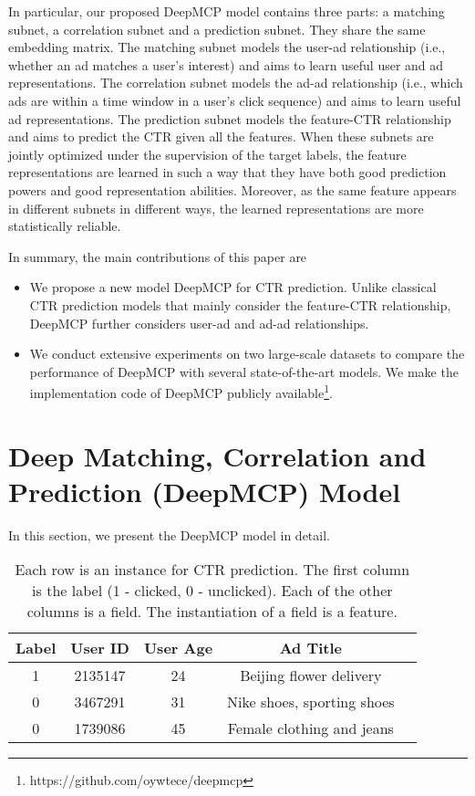\documentclass{article}
\begin{document}
In particular, our proposed DeepMCP model contains three parts: a matching subnet, a correlation subnet and a prediction subnet. They share the same embedding matrix.
The matching subnet models the user-ad relationship (i.e., whether an ad matches a user's interest) and aims to learn useful user and ad representations.
The correlation subnet models the ad-ad relationship (i.e., which ads are within a time window in a user's click sequence) and aims to learn useful ad representations.
The prediction subnet models the feature-CTR relationship and aims to predict the CTR given all the features.
When these subnets are jointly optimized under the supervision of the target labels, the feature representations are learned in such a way that they have both good prediction powers and good representation abilities. Moreover, as the same feature appears in different subnets in different ways, the learned representations are more statistically reliable.

In summary, the main contributions of this paper are
\begin{itemize} \item We propose a new model DeepMCP for CTR prediction. Unlike classical CTR prediction models that mainly consider the feature-CTR relationship, DeepMCP further considers user-ad and ad-ad relationships.
\item We conduct extensive experiments on two large-scale datasets to compare the performance of DeepMCP with several state-of-the-art models. We make the implementation code of DeepMCP publicly available\footnote{https://github.com/oywtece/deepmcp}.
\end{itemize}

\section{Deep Matching, Correlation and Prediction (DeepMCP) Model} \label{sec_deepmcp}
In this section, we present the DeepMCP model in detail.

\begin{table}[!t]
\setlength{\tabcolsep}{3pt}
\renewcommand{\arraystretch}{1.2}
\centering
\begin{tabular}{|c|c|c|c|c|}
\hline
\textbf{Label} & \textbf{User ID} & \textbf{User Age} & \textbf{Ad Title} \\
\hline
1 & 2135147 & 24 & Beijing flower delivery \\
\hline
0 & 3467291 & 31 & Nike shoes, sporting shoes \\
\hline
0 & 1739086 & 45 & Female clothing and jeans \\
\hline
\end{tabular}
\vskip -4pt
\caption{Each row is an instance for CTR prediction. The first column is the label (1 - clicked, 0 - unclicked). Each of the other columns is a field. The instantiation of a field is a feature.}
\label{tab_ft}
\vskip -4pt
\end{table}
\end{document}
